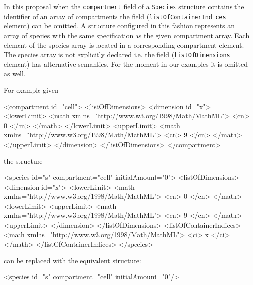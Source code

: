 \documentclass{cekarticle}
\begin{document}
In this proposal when the \texttt{compartment} field of a
\texttt{Species} structure contains the identifier of an array of
compartments the  field (\texttt{listOfContainerIndices} element) can be omitted.
A structure configured in this fashion
represents an array of species with the same specification as the
given compartment array.  Each element of the species array is
located in a corresponding compartment element.  The species array
is not explicitly declared i.e. the  field (\texttt{listOfDimensions} element)
has alternative semantics.  For the moment in our examples it is omitted as well.

For example given
\begin{example}
<compartment id="cell">
    <listOfDimensions>
         <dimension id="x">
             <lowerLimit>
                 <math xmlns="http://www.w3.org/1998/Math/MathML">
                     <cn> 0 </cn>
                 </math>
             </lowerLimit>
             <upperLimit>
                 <math xmlns="http://www.w3.org/1998/Math/MathML">
                     <cn> 9 </cn>
                 </math>
             </upperLimit>
         </dimension>
    </listOfDimensions>
</compartment>
\end{example}
the structure
\begin{example}
<species id="s" compartment="cell" initialAmount="0">
    <listOfDimensions>
        <dimension id="x">
            <lowerLimit>
                <math xmlns="http://www.w3.org/1998/Math/MathML">
                    <cn> 0 </cn>
                </math>
            <lowerLimit>
            <upperLimit>
                <math xmlns="http://www.w3.org/1998/Math/MathML">
                    <cn> 9 </cn>
                </math>
            <upperLimit>
        </dimension>
    </listOfDimensions>
    <listOfContainerIndices>
        <math xmlns="http://www.w3.org/1998/Math/MathML">
            <ci> x </ci>
        </math>
    </listOfContainerIndices>
</species>
\end{example}
can be replaced with the equivalent structure:
\begin{example}
<species id="s" compartment="cell" initialAmount="0"/>
\end{example}
\end{document}
